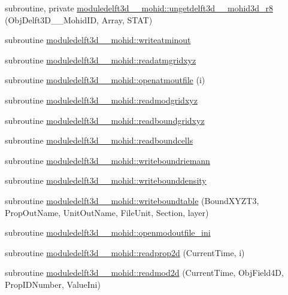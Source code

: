 \begin{DoxyCompactItemize}
\item 
subroutine, private \mbox{\hyperlink{namespacemoduledelft3d__2__mohid_a54e3fcc0277aae3ad660ec439e7e4a3c}{moduledelft3d\+\_\+\_\+mohid\+::ungetdelft3d\+\_\+\_\+mohid3d\+\_\+r8}} (Obj\+Delft3\+D\+\_\+\_\+\+Mohid\+ID, Array, S\+T\+AT)
\item 
subroutine \mbox{\hyperlink{namespacemoduledelft3d__2__mohid_aaf8ed07f19208b8787807cb35199dca4}{moduledelft3d\+\_\+\_\+mohid\+::writeatminout}}
\item 
subroutine \mbox{\hyperlink{namespacemoduledelft3d__2__mohid_a8f18a6dd61d1e7402d91d20b87b39b18}{moduledelft3d\+\_\+\_\+mohid\+::readatmgridxyz}}
\item 
subroutine \mbox{\hyperlink{namespacemoduledelft3d__2__mohid_af28ee3088f02a7a2168e6d5ea6eb97e3}{moduledelft3d\+\_\+\_\+mohid\+::openatmoutfile}} (i)
\item 
subroutine \mbox{\hyperlink{namespacemoduledelft3d__2__mohid_ac6c4455bd51132eb023e2e4030641dc2}{moduledelft3d\+\_\+\_\+mohid\+::readmodgridxyz}}
\item 
subroutine \mbox{\hyperlink{namespacemoduledelft3d__2__mohid_a07dc591a7f52b875d18aee392df1d13d}{moduledelft3d\+\_\+\_\+mohid\+::readboundgridxyz}}
\item 
subroutine \mbox{\hyperlink{namespacemoduledelft3d__2__mohid_abd4423475ad3b1f766d3bfe7af38a4ae}{moduledelft3d\+\_\+\_\+mohid\+::readboundcells}}
\item 
subroutine \mbox{\hyperlink{namespacemoduledelft3d__2__mohid_a1a45560fe1480c753bc904201b817966}{moduledelft3d\+\_\+\_\+mohid\+::writeboundriemann}}
\item 
subroutine \mbox{\hyperlink{namespacemoduledelft3d__2__mohid_ae59d00e73feaf12262e517adad081642}{moduledelft3d\+\_\+\_\+mohid\+::writebounddensity}}
\item 
subroutine \mbox{\hyperlink{namespacemoduledelft3d__2__mohid_a8b7bcfa950bb28feff319224f0ee581e}{moduledelft3d\+\_\+\_\+mohid\+::writeboundtable}} (Bound\+X\+Y\+Z\+T3, Prop\+Out\+Name, Unit\+Out\+Name, File\+Unit, Section, layer)
\item 
subroutine \mbox{\hyperlink{namespacemoduledelft3d__2__mohid_aa98d814db6ab0cc5e69895b0124b6e95}{moduledelft3d\+\_\+\_\+mohid\+::openmodoutfile\+\_\+ini}}
\item 
subroutine \mbox{\hyperlink{namespacemoduledelft3d__2__mohid_a34356a964207fa4a212d0973afb377b2}{moduledelft3d\+\_\+\_\+mohid\+::readprop2d}} (Current\+Time, i)
\item 
subroutine \mbox{\hyperlink{namespacemoduledelft3d__2__mohid_a677f5946463bc1873841fd2e4a910617}{moduledelft3d\+\_\+\_\+mohid\+::readmod2d}} (Current\+Time, Obj\+Field4D, Prop\+I\+D\+Number, Value\+Ini)

\end{DoxyCompactItemize}
